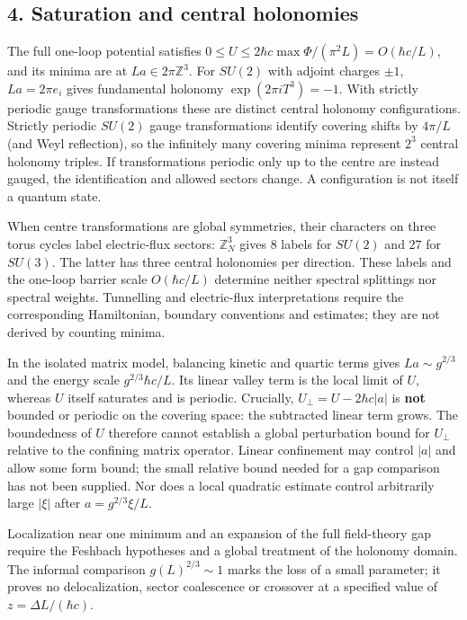 \documentclass[11pt,a4paper]{article}
\begin{document}
\hypertarget{saturation-and-central-holonomies}{%
\subsection{4. Saturation and central
holonomies}\label{saturation-and-central-holonomies}}

The full one-loop potential satisfies
\(0\le U\le2\hbar c\max\Phi/(\pi^2L)=O(\hbar c/L)\), and its minima are
at \(La\in2\pi\mathbb Z^3\). For \(SU(2)\) with adjoint charges
\(\pm1\), \(La=2\pi e_i\) gives fundamental holonomy
\(\exp(2\pi iT^3)=-1\). With strictly periodic gauge transformations
these are distinct central holonomy configurations. Strictly periodic
\(SU(2)\) gauge transformations identify covering shifts by \(4\pi/L\)
(and Weyl reflection), so the infinitely many covering minima represent
\(2^3\) central holonomy triples. If transformations periodic only up to
the centre are instead gauged, the identification and allowed sectors
change. A configuration is not itself a quantum state.

When centre transformations are global symmetries, their characters on
three torus cycles label electric-flux sectors: \(\mathbb Z_N^3\) gives
\(8\) labels for \(SU(2)\) and \(27\) for \(SU(3)\). The latter has
three central holonomies per direction. These labels and the one-loop
barrier scale \(O(\hbar c/L)\) determine neither spectral splittings nor
spectral weights. Tunnelling and electric-flux interpretations require
the corresponding Hamiltonian, boundary conventions and estimates; they
are not derived by counting minima.

In the isolated matrix model, balancing kinetic and quartic terms gives
\(La\sim g^{2/3}\) and the energy scale \(g^{2/3}\hbar c/L\). Its linear
valley term is the local limit of \(U\), whereas \(U\) itself saturates
and is periodic. Crucially, \(U_\perp=U-2\hbar c|a|\) is \textbf{not}
bounded or periodic on the covering space: the subtracted linear term
grows. The boundedness of \(U\) therefore cannot establish a global
perturbation bound for \(U_\perp\) relative to the confining matrix
operator. Linear confinement may control \(|a|\) and allow some form
bound; the small relative bound needed for a gap comparison has not been
supplied. Nor does a local quadratic estimate control arbitrarily large
\(|\xi|\) after \(a=g^{2/3}\xi/L\).

Localization near one minimum and an expansion of the full field-theory
gap require the Feshbach hypotheses and a global treatment of the
holonomy domain. The informal comparison \(g(L)^{2/3}\sim1\) marks the
loss of a small parameter; it proves no delocalization, sector
coalescence or crossover at a specified value of
\(z=\Delta L/(\hbar c)\).
\end{document}
